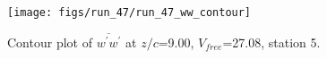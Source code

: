 \begin{figure}[H]
\centering
\texttt{[image: figs/run\_47/run\_47\_ww\_contour]}
\caption{Contour plot of $\overline{w^\prime w^\prime}$ at $z/c$=9.00, $V_{free}$=27.08, station 5.}
\label{fig:run_47_ww_contour}
\end{figure}


